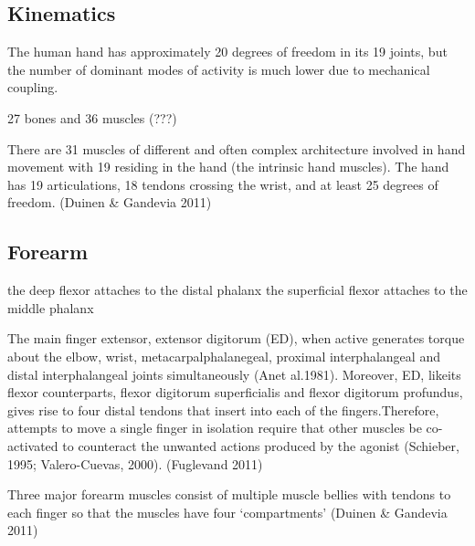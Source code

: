{            \hypertarget{kinematics}{%
            \subsection{Kinematics}\label{kinematics}}

            The human hand has approximately 20 degrees of freedom in
            its 19 joints, but the number of dominant modes of activity
            is much lower due to mechanical coupling.

            27 bones and 36 muscles (???)

            There are 31 muscles of different and often complex
            architecture involved in hand movement with 19 residing in
            the hand (the intrinsic hand muscles). The hand has 19
            articulations, 18 tendons crossing the wrist, and at least
            25 degrees of freedom. (Duinen \& Gandevia 2011)

            \hypertarget{forearm}{%
            \subsection{Forearm}\label{forearm}}

            the deep flexor attaches to the distal phalanx the
            superficial flexor attaches to the middle phalanx

            The main finger extensor, extensor digitorum (ED), when
            active generates torque about the elbow, wrist,
            metacarpalphalanegeal, proximal interphalangeal and distal
            interphalangeal joints simultaneously (Anet al.1981).
            Moreover, ED, likeits flexor counterparts, flexor digitorum
            superficialis and flexor digitorum profundus, gives rise to
            four distal tendons that insert into each of the
            fingers.Therefore, attempts to move a single finger in
            isolation require that other muscles be co-activated to
            counteract the unwanted actions produced by the agonist
            (Schieber, 1995; Valero-Cuevas, 2000). (Fuglevand 2011)

            Three major forearm muscles consist of multiple muscle
            bellies with tendons to each finger so that the muscles have
            four `compartments' (Duinen \& Gandevia 2011)

}
